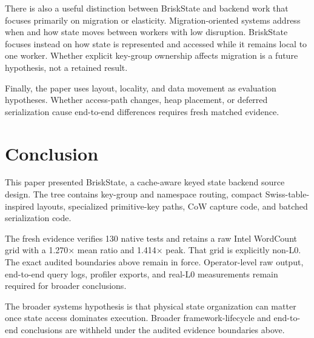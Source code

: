 \documentclass[journal]{IEEEtran}
\newcommand{\briskstate}{BriskState\xspace}
\newcommand{\system}{\briskstate}
\begin{document}
There is also a useful distinction between \system and backend work that focuses primarily on migration or elasticity. Migration-oriented systems address when and how state moves between workers with low disruption. \system focuses instead on how state is represented and accessed while it remains local to one worker. Whether explicit key-group ownership affects migration is a future hypothesis, not a retained result.

Finally, the paper uses layout, locality, and data movement as evaluation hypotheses. Whether access-path changes, heap placement, or deferred serialization cause end-to-end differences requires fresh matched evidence.

\section{Conclusion}

This paper presented \system, a cache-aware keyed state backend source design. The tree contains key-group and namespace routing, compact Swiss-table-inspired layouts, specialized primitive-key paths, CoW capture code, and batched serialization code.

The fresh evidence verifies 130 native tests and retains a raw Intel WordCount grid with a 1.270$\times$ mean ratio and 1.414$\times$ peak. That grid is explicitly non-L0. The exact audited boundaries above remain in force. Operator-level raw output, end-to-end query logs, profiler exports, and real-L0 measurements remain required for broader conclusions.

The broader systems hypothesis is that physical state organization can matter once state access dominates execution. Broader framework-lifecycle and end-to-end conclusions are withheld under the audited evidence boundaries above.



\end{document}
